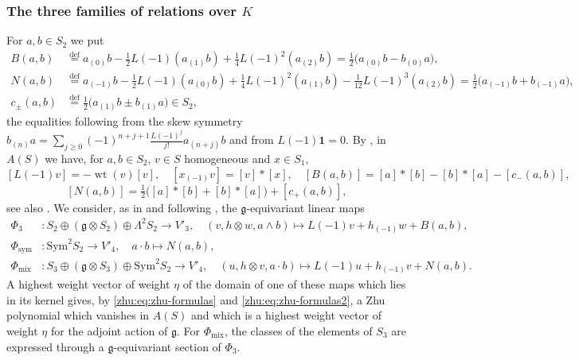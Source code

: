 \documentclass[leqno]{article}
\renewcommand{\geq}{\ensuremath{\geqslant}}
\newcommand{\co}{\colon}
\newcommand{\ot}{\otimes}
\newcommand{\ov}{\overset}
\numberwithin{equation}{section}
\begin{document}
\subsubsection{The three families of relations over \texorpdfstring{$K$}{K}}
\label{zhu:subsec:families}

For $a, b \in S_2$ we put
\begin{align*}
B(a,b) &\ov{\mathrm{def}}{=} a_{(0)}b - \tfrac12 L(-1)(a_{(1)}b) + \tfrac14 L(-1)^2(a_{(2)}b) = \tfrac12\big(a_{(0)}b - b_{(0)}a\big),\\
N(a,b) &\ov{\mathrm{def}}{=} a_{(-1)}b - \tfrac12 L(-1)(a_{(0)}b) + \tfrac14 L(-1)^2(a_{(1)}b) - \tfrac1{12}L(-1)^3(a_{(2)}b) = \tfrac12\big(a_{(-1)}b + b_{(-1)}a\big),\\
c_\pm(a,b) &\ov{\mathrm{def}}{=} \tfrac12\big(a_{(1)}b \pm b_{(1)}a\big) \in S_2,
\end{align*}
the equalities following from the skew symmetry $b_{(n)}a = \sum_{j \geq 0} (-1)^{n+j+1} \frac{L(-1)^j}{j!} a_{(n+j)}b$ and from $L(-1)\mathbf 1 = 0$. By \cite[Lemma 2.1.1 p.~247 and (2.1.4) p.~248]{Zhu96}, in $A(S)$ we have, for $a, b \in S_2$, $v \in S$ homogeneous and $x \in S_1$,
\begin{equation}
\label{zhu:eq:zhu-formulas}
[L(-1)v] = -\operatorname{wt}(v)[v],\quad [x_{(-1)}v] = [v] * [x],\quad [B(a,b)] = [a]*[b] - [b]*[a] - [c_-(a,b)],
\end{equation}
\begin{equation}
\label{zhu:eq:zhu-formulas2}
[N(a,b)] = \tfrac12\big([a]*[b] + [b]*[a]\big) + [c_+(a,b)],
\end{equation}
see also \cite[(11.1)]{Arh26}. We consider, as in \cite[Theorem 11.6]{Arh26} and following \cite[Section 9]{Rie26b}, the $\mathfrak g$-equivariant linear maps
\begin{align*}
\Phi_3 &\co S_2 \oplus (\mathfrak g \ot S_2) \oplus \Lambda^2 S_2 \to V'_3,\quad (v, h \ot w, a \wedge b) \mapsto L(-1)v + h_{(-1)}w + B(a,b),\\
\Phi_{\mathrm{sym}} &\co \mathrm{Sym}^2 S_2 \to V'_4,\quad a \cdot b \mapsto N(a,b),\\
\Phi_{\mathrm{mix}} &\co S_3 \oplus (\mathfrak g \ot S_3) \oplus \mathrm{Sym}^2 S_2 \to V'_4,\quad (u, h \ot v, a \cdot b) \mapsto L(-1)u + h_{(-1)}v + N(a,b).
\end{align*}
A highest weight vector of weight $\eta$ of the domain of one of these maps which lies in its kernel gives, by \eqref{zhu:eq:zhu-formulas} and \eqref{zhu:eq:zhu-formulas2}, a Zhu polynomial which vanishes in $A(S)$ and which is a highest weight vector of weight $\eta$ for the adjoint action of $\mathfrak g$. For $\Phi_{\mathrm{mix}}$, the classes of the elements of $S_3$ are expressed through a $\mathfrak g$-equivariant section of $\Phi_3$.
\end{document}
